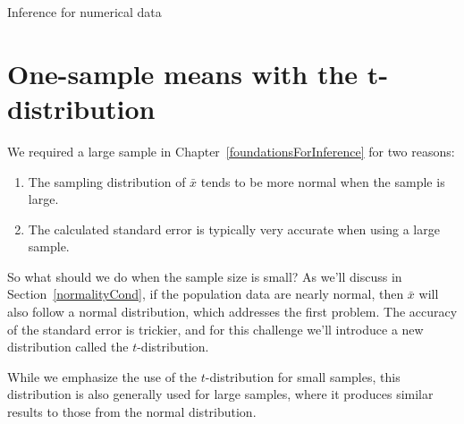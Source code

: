 \begin{chapterpage}{Inference for numerical data}
  \label{inferenceForNumericalData}
  \label{ch_inference_for_means}
\end{chapterpage}
\renewcommand{\chapterfolder}{ch_inference_for_means}





\section[One-sample means with the $t$-distribution]{One-sample means with the $\mathbf{t}$-distribution}
\label{oneSampleMeansWithTDistribution}

\noindent%
We required a large sample in Chapter~\ref{foundationsForInference} for two reasons:
\begin{enumerate}
\setlength{\itemsep}{0mm}
\item The sampling distribution of $\bar{x}$ tends to be more normal when the sample is large.
\item The calculated standard error is typically very accurate when using a large sample.
\end{enumerate}
So what should we do when the sample size is small? As we'll discuss in Section~\ref{normalityCond}, if the population data are nearly normal, then $\bar{x}$ will also follow a normal distribution, which addresses the first problem. The accuracy of the standard error is trickier, and for this challenge we'll introduce a new distribution called the $t$-distribution.

While we emphasize the use of the $t$-distribution for small samples, this distribution is also generally used for large samples, where it produces similar results to those from the normal distribution.


